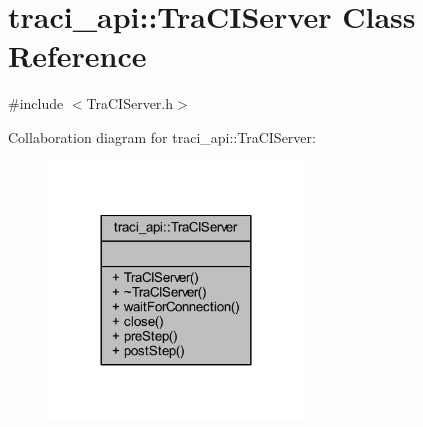 \hypertarget{classtraci__api_1_1_tra_c_i_server}{}\section{traci\+\_\+api\+:\+:Tra\+C\+I\+Server Class Reference}
\label{classtraci__api_1_1_tra_c_i_server}


{\ttfamily \#include $<$Tra\+C\+I\+Server.\+h$>$}



Collaboration diagram for traci\+\_\+api\+:\+:Tra\+C\+I\+Server\+:
\nopagebreak
\begin{figure}[H]
\begin{center}
\leavevmode
\includegraphics[width=192pt]{classtraci__api_1_1_tra_c_i_server__coll__graph}
\end{center}
\end{figure}
